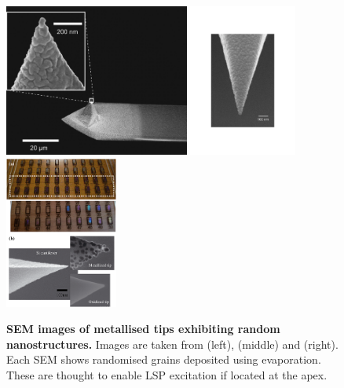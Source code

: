 \documentclass{article}
\begin{document}
\begin{figure}[bt]
\centering
\includegraphics[height=5cm, clip=true, trim=5 75 113 10]{figures/literature/nn-2014-031803_0002}
\includegraphics[height=5cm, clip=true, trim=170 180 140 280]{figures/literature/uetsuki2012supp}
\includegraphics[height=5cm, clip=true, trim=20 5 0 165]{figures/literature/jrs4032-fig-0001}
\caption[]{\textbf{SEM images of metallised tips exhibiting random nanostructures.} Images are taken from \cite{mino2014} (left), \cite{uetsuki2012} (middle) and \cite{hayazawa2012} (right). Each SEM shows randomised grains deposited using evaporation. These are thought to enable LSP excitation if located at the apex.}
\label{fig:metallised_tips}
\end{figure}
\end{document}
